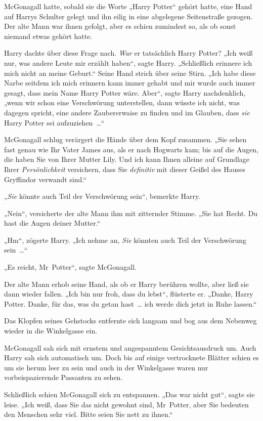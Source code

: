 {McGonagall hatte, sobald sie die Worte „Harry Potter“ gehört hatte, eine Hand auf Harrys Schulter gelegt und ihn eilig in eine abgelegene Seitenstraße gezogen. Der alte Mann war ihnen gefolgt, aber es schien zumindest so, als ob sonst niemand etwas gehört hatte.

Harry dachte über diese Frage nach. \emph{War} er tatsächlich Harry Potter? „Ich weiß nur, was andere Leute mir erzählt haben“, sagte Harry. „Schließlich erinnere ich mich nicht an meine Geburt.“ Seine Hand strich über seine Stirn. „Ich habe diese Narbe seitdem ich mich erinnern kann immer gehabt und mir wurde auch immer gesagt, dass mein Name Harry Potter wäre. Aber“, sagte Harry nachdenklich, „wenn wir schon eine Verschwörung unterstellen, dann wüsste ich nicht, was dagegen spricht, eine andere Zaubererwaise zu finden und im Glauben, dass \emph{sie} Harry Potter sei aufzuziehen~…“

McGonagall schlug verärgert die Hände über dem Kopf zusammen. „Sie sehen fast genau wie Ihr Vater James aus, als er nach Hogwarts kam; bis auf die Augen, die haben Sie von Ihrer Mutter Lily. Und ich kann Ihnen alleine auf Grundlage Ihrer \emph{Persönlichkeit} versichern, dass Sie \emph{definitiv} mit dieser Geißel des Hauses Gryffindor verwandt sind.“

„\emph{Sie} könnte auch Teil der Verschwörung sein“, bemerkte Harry.

„Nein“, versicherte der alte Mann ihm mit zitternder Stimme. „Sie hat Recht. Du hast die Augen deiner Mutter.“

„Hm“, zögerte Harry. „Ich nehme an, \emph{Sie} könnten auch Teil der Verschwörung sein~…“

„Es reicht, Mr~Potter“, sagte McGonagall.

Der alte Mann erhob seine Hand, als ob er Harry berühren wollte, aber ließ sie dann wieder fallen. „Ich bin nur froh, dass du lebst“, flüsterte er. „Danke, Harry Potter. Danke, für das, was du getan hast~… ich werde dich jetzt in Ruhe lassen.“

Das Klopfen seines Gehstocks entfernte sich langsam und bog aus dem Nebenweg wieder in die Winkelgasse ein.

McGonagall sah sich mit ernstem und angespanntem Gesichtsausdruck um. Auch Harry sah sich automatisch um. Doch bis auf einige vertrocknete Blätter schien es um sie herum leer zu sein und auch in der Winkelgasse waren nur vorbeispazierende Passanten zu sehen.

Schließlich schien McGonagall sich zu entspannen. „Das war nicht gut“, sagte sie leise. „Ich weiß, dass Sie das nicht gewohnt sind, Mr~Potter, aber Sie bedeuten den Menschen sehr viel. Bitte seien Sie nett zu ihnen.“

}
